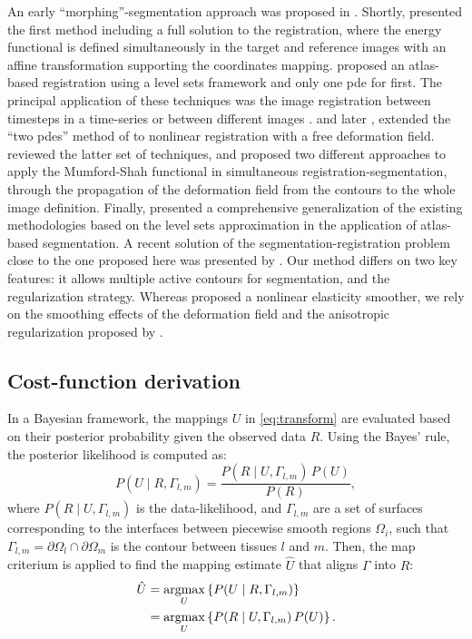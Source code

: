 An early ``morphing''-segmentation approach was proposed in \citep{bertalmio_morphing_2000}.
Shortly, \cite{yezzi_variational_2001} presented the first method including a full solution to
  the registration, where the energy functional is defined simultaneously in the target
  and reference images with an affine transformation supporting the coordinates mapping.
\cite{vemuri_joint_2003} proposed an atlas-based registration using a level sets
  framework and only one \gls*{pde} for first.
The principal application of these techniques was the image registration between timesteps in
  a time-series or between different images \citep{paragios_level_2003}.
\cite{unal_coupled_2005} and later \cite{wang_joint_2006},
  extended the ``two \glspl*{pde}'' method of \cite{yezzi_variational_2001}
  to nonlinear registration with a free deformation field.
\cite{droske_mumfordshah_2009} reviewed the latter set of techniques, and proposed two different
  approaches to apply the Mumford-Shah functional \citep{mumford_optimal_1989} in simultaneous
  registration-segmentation, through the propagation of the deformation field from
  the contours to the whole image definition.
Finally, \cite{gorthi_active_2011} presented a comprehensive generalization of the
  existing methodologies based on the level sets approximation in the application of
  atlas-based segmentation.
A recent solution of the segmentation-registration problem close to the one proposed here was
  presented by \cite{guyader_combined_2011}.
Our method differs on two key features:
  it allows multiple active contours for segmentation, and the regularization strategy.
Whereas \cite{guyader_combined_2011} proposed a nonlinear elasticity smoother, we rely on
  the smoothing effects of the deformation field and the anisotropic regularization
  proposed by \cite{nagel_investigation_1986}.


\subsection*{Cost-function derivation}
\label{sec:methods_map}

In a Bayesian framework, the mappings $U$ in \autoref{eq:transform} are
  evaluated based on their posterior probability given the observed data
  $R$.
Using the Bayes' rule, the posterior likelihood is computed as:
  \begin{equation}
  P(U \mid R,\Gamma_{l,m}) = \frac{P(R \mid U,\Gamma_{l,m})\, P(U)}{P(R)},
  \label{eq:bayes_rule}
  \end{equation}
  where $P(R \mid U,\Gamma_{l,m})$ is the data-likelihood, and
  $\Gamma_{l,m}$ are a set of surfaces corresponding to the interfaces
  between piecewise smooth regions $\Omega_i$, such that
  $\Gamma_{l,m} = \partial \Omega_l \cap \partial \Omega_m$ is the
  contour between tissues $l$ and $m$.
Then, the \gls*{map} criterium is applied to find the mapping estimate $\hat{U}$
  that aligns $\Gamma$ into $R$:
  \begin{align}
  \hat{U} &= \underset{U}{\operatorname{argmax}} \left\{ P(U \mid R,\Gamma_{l,m}) \right\} \notag\\
   &= \underset{U}{\operatorname{argmax}} \left\{ P(R \mid U,\Gamma_{l,m})\, P(U) \right\}.
  \label{eq:map_u}
  \end{align}

